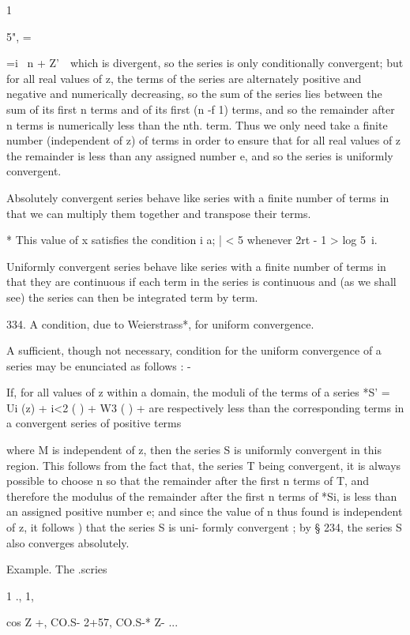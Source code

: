 1

5", =

 =i \ n + Z'\ \ which is divergent, so the series is only
conditionally convergent; but for all real values of z, the terms of
the series are alternately positive and negative and numerically
decreasing, so the sum of the series lies between the sum of its first
n terms and of its first (n -f 1) terms, and so the remainder after n
terms is numerically less than the nth. term. Thus we only need take a
finite number (independent of z) of terms in order to ensure that for
all real values of z the remainder is less than any assigned number e,
and so the series is uniformly convergent.

Absolutely convergent series behave like series with a finite number
of terms in that we can multiply them together and transpose their
terms.

* This value of x satisfies the condition i a; | < 5 whenever 2rt - 1
> log 5~i.

%
%

Uniformly convergent series behave like series with a finite number of
terms in that they are continuous if each term in the series is
continuous and (as we shall see) the series can then be integrated
term by term.

334. A condition, due to Weierstrass*, for uniform convergence.

A sufficient, though not necessary, condition for the uniform
convergence of a series may be enunciated as follows : -

If, for all values of z within a domain, the moduli of the terms of a
series *S' = Ui (z) + i<2 ( ) + W3 ( ) +    are respectively less
than the corresponding terms in a convergent series of positive terms

where M is independent of z, then the series S is uniformly convergent
in this region. This follows from the fact that, the series T being
convergent, it is always possible to choose n so that the remainder
after the first n terms of T, and therefore the modulus of the
remainder after the first n terms of *Si, is less than an assigned
positive number e; and since the value of n thus found is independent
of z, it follows ) that the series S is uni- formly convergent
; by § 234, the series S also converges absolutely.

Example. The .scries

1 ., 1,

cos Z +, CO.S- 2+57, CO.S-* Z- ...

